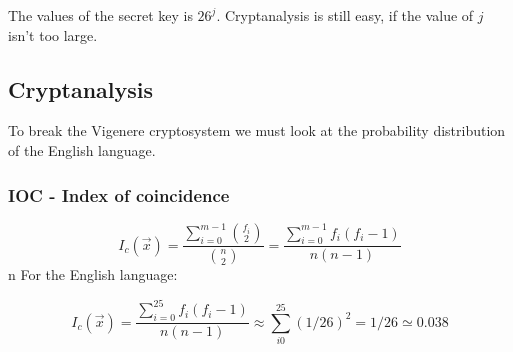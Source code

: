 The values of the secret key is $26^j$. Cryptanalysis is still easy,
if the value of $j$ isn't too large.
\subsection{Cryptanalysis}
To break the Vigenere cryptosystem we must look at the probability
distribution of the English language. 
\subsubsection{IOC - Index of coincidence}

\[ I_c(\vec{x}) =
\frac{\sum^{m-1}_{i=0}\binom{f_i}{2}}{\binom{n}{2}}=
\frac{\sum^{m-1}_{i=0}f_i(f_i - 1)}{n(n-1)}\] 
n
For the English language:

\[ I_c(\vec{x}) =
\frac{\sum^{25}_{i=0}f_i(f_i - 1)}{n(n-1)} \approx
\sum^{25}_{i0}(1/26)^2= 1/26 \simeq 0.038\] 

